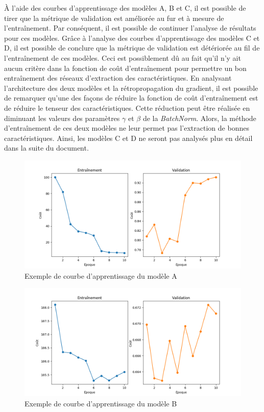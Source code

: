     À l'aide des courbes d'apprentissage des modèles A, B et C, il est possible de tirer que la métrique de validation est améliorée au fur et à mesure de l'entraînement. Par conséquent, il est possible de continuer l'analyse de résultats pour ces modèles. Grâce à l'analyse des courbes d'apprentissage des modèles C et D, il est possible de conclure que la métrique de validation est détériorée au fil de l'entraînement de ces modèles. Ceci est possiblement dû au fait qu'il n'y ait aucun critère dans la fonction de coût d'entraînement pour permettre un bon entraînement des réseaux d'extraction des caractéristiques. En analysant l'architecture des deux modèles et la rétropropagation du gradient, il est possible de remarquer qu'une des façons de réduire la fonction de coût d'entraînement est de réduire le tenseur des caractéristiques. Cette réduction peut être réalisée en diminuant les valeurs des paramètres \(\gamma\) et \(\beta\) de la \textit{BatchNorm}. Alors, la méthode d'entraînement de ces deux modèles ne leur permet pas l'extraction de bonnes caractéristiques. Ainsi, les modèles C et D ne seront pas analysés plus en détail dans la suite du document.

    \begin{figure}
        \centering
        \includegraphics[width=16cm]{images/learning_curves_a.png}
        \caption{Exemple de courbe d'apprentissage du modèle A}
        \label{fig:learning_curves_a}
    \end{figure}

    \begin{figure}
        \centering
        \includegraphics[width=16cm]{images/learning_curves_b.png}
        \caption{Exemple de courbe d'apprentissage du modèle B}
        \label{fig:learning_curves_b}
    \end{figure}


